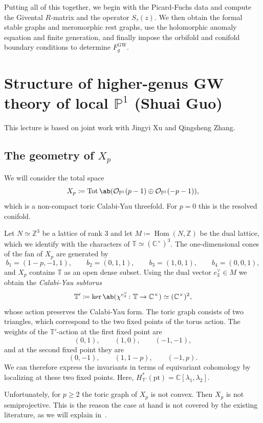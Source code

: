 \documentclass{amsart}
\theoremstyle{definition}
\theoremstyle{remark}
\theoremstyle{plain}
\theoremstyle{definition}
\theoremstyle{remark}
\newcommand{\C}{\mathbb{C}}
\newcommand{\Z}{\mathbb{Z}}
\renewcommand{\P}{\mathbb{P}}
\newcommand{\mc}[1]{\mathcal{#1}}
\newcommand{\T}{\mathbb{T}}
\newcommand{\mr}[1]{\mathrm{#1}}
\newcommand{\on}[1]{\operatorname{#1}}
\newcommand{\1}{\mathbf{1}}
\newcommand{\2}{\mathbf{2}}
\newcommand{\3}{\mathbf{3}}
\DeclareMathOperator{\Hom}{Hom}
\begin{document}
Putting all of this together, we begin with the Picard-Fuchs data and compute the Givental \(R\)-matrix and the operator \(S_{\tau}(z)\). We then obtain the formal stable graphs and meromorphic rest graphs, use the holomorphic anomaly equation and finite generation, and finally impose the orbifold and conifold boundary conditions to determine \(F_g^{\mr{GW}}\).

\section{\texorpdfstring{Structure of higher-genus GW theory of local \(\P^1\)}{Structure of higher-genus GW theory of local P1} (Shuai Guo)}%
\label{sec:Structure of higher-genus GW theory of local P1 (Shuai Guo)}

This lecture is based on joint work with Jingyi Xu and Qingsheng Zhang.

\subsection{The geometry of \(X_p\)}%
\label{sub:The geometry of Xp}

We will consider the total space
\[ X_p \coloneqq \on{Tot}\ab(\mc{O}_{\P^1}(p-1) \oplus \mc{O}_{\P^1}(-p-1)), \]
which is a non-compact toric Calabi-Yau threefold. For \(p = 0\) this is the resolved conifold.

Let \(N \simeq \Z^3\) be a lattice of rank \(3\) and let \(M \coloneqq \Hom(N,\Z)\) be the dual lattice, which we identify with the characters of \(\T \simeq (\C^{\times})^3\). The one-dimensional cones of the fan of \(X_p\) are generated by
\[ b_1 = (1-p,-1,1), \qquad b_2 = (0,1,1), \qquad b_3 = (1,0,1), \qquad b_4 = (0,0,1), \]
and \(X_p\) contains \(\T\) as an open dense subset. Using the dual vector \(e_3^{\vee} \in M\) we obtain the \textit{Calabi-Yau subtorus}
\[ \T' \coloneqq \ker\ab(\chi^{e_3^{\vee}} \colon \T \to \C^{\times}) \simeq (\C^{\times})^2, \]
whose action preserves the Calabi-Yau form. The toric graph consists of two triangles, which correspond to the two fixed points of the torus action. The weights of the \(\T'\)-action at the first fixed point are
\[ (0,1), \qquad (1,0), \qquad (-1,-1), \]
and at the second fixed point they are
\[ (0,-1), \qquad (1,1-p), \qquad (-1,p). \]
We can therefore express the invariants in terms of equivariant cohomology by localizing at these two fixed points. Here, \(H^*_{\T'}(\mr{pt}) = \C[\lambda_1,\lambda_2]\).

Unfortunately, for \(p \geq 2\) the toric graph of \(X_p\) is not convex. Then \(X_p\) is not semiprojective. This is the reason the case at hand is not covered by the existing literature, as we will explain in~.
\end{document}
